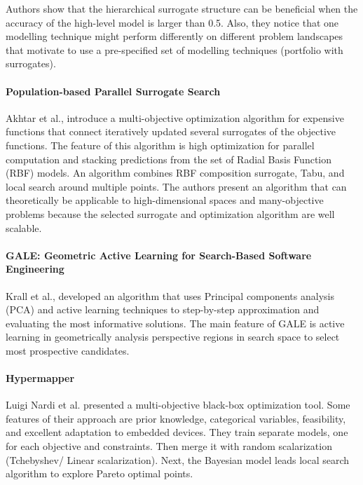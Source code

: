         Authors show that the hierarchical surrogate structure can be beneficial when the accuracy of the high-level model is larger than 0.5. Also, they notice that one modelling technique might perform differently on different problem landscapes that motivate to use a pre-specified set of modelling techniques (portfolio with surrogates).
        
        \paragraph{Population-based Parallel Surrogate Search} Akhtar et al.,\cite{akhtar2019efficient} introduce a multi-objective optimization algorithm for expensive functions that connect iteratively updated several surrogates of the objective functions. The feature of this algorithm is high optimization for parallel computation and stacking predictions from the set of Radial Basis Function (RBF) models. An algorithm combines RBF composition surrogate, Tabu, and local search around multiple points. The authors present an algorithm that can theoretically be applicable to high-dimensional spaces and many-objective problems because the selected surrogate and optimization algorithm are well scalable.


        \paragraph{GALE: Geometric Active Learning for Search-Based Software Engineering} Krall et al.,\cite{KrallMD15} developed an algorithm that uses Principal components analysis (PCA) and active learning techniques to step-by-step approximation and evaluating the most informative solutions. The main feature of GALE is active learning in geometrically analysis perspective regions in search space to select most prospective candidates.

        \paragraph{Hypermapper} Luigi Nardi et al. \cite{nardi2019practical} presented a multi-objective black-box optimization tool. Some features of their approach are prior knowledge, categorical variables, feasibility, and excellent adaptation to embedded devices. They train separate models, one for each objective and constraints. Then merge it with random scalarization (Tchebyshev/ Linear scalarization). Next, the Bayesian model leads local search algorithm to explore Pareto optimal points. 

